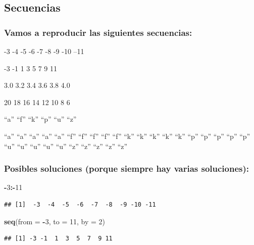 \documentclass[]{book}
\newenvironment{Shaded}{\begin{snugshade}}{\end{snugshade}}
\newcommand{\KeywordTok}[1]{\textcolor[rgb]{0.13,0.29,0.53}{\textbf{#1}}}
\newcommand{\DataTypeTok}[1]{\textcolor[rgb]{0.13,0.29,0.53}{#1}}
\newcommand{\DecValTok}[1]{\textcolor[rgb]{0.00,0.00,0.81}{#1}}
\newcommand{\OperatorTok}[1]{\textcolor[rgb]{0.81,0.36,0.00}{\textbf{#1}}}
\newcommand{\NormalTok}[1]{#1}
\begin{document}
\subsection{Secuencias}\label{secuencias}

\subsubsection{Vamos a reproducir las siguientes
secuencias:}\label{vamos-a-reproducir-las-siguientes-secuencias}

-3 -4 -5 -6 -7 -8 -9 -10 --11

-3 -1 1 3 5 7 9 11

3.0 3.2 3.4 3.6 3.8 4.0

20 18 16 14 12 10 8 6

``a'' ``f'' ``k'' ``p'' ``u'' ``z''

``a'' ``a'' ``a'' ``a'' ``a'' ``f'' ``f'' ``f'' ``f'' ``f'' ``k'' ``k''
``k'' ``k'' ``k'' ``p'' ``p'' ``p'' ``p'' ``p'' ``u'' ``u'' ``u'' ``u''
``u'' ``z'' ``z'' ``z'' ``z'' ``z''

\subsubsection{Posibles soluciones (porque siempre hay varias
soluciones):}\label{posibles-soluciones-porque-siempre-hay-varias-soluciones}

\begin{Shaded}
\begin{Highlighting}[]
\OperatorTok{-}\DecValTok{3}\OperatorTok{:-}\DecValTok{11}
\end{Highlighting}
\end{Shaded}

\begin{verbatim}
## [1]  -3  -4  -5  -6  -7  -8  -9 -10 -11
\end{verbatim}

\begin{Shaded}
\begin{Highlighting}[]
\KeywordTok{seq}\NormalTok{(}\DataTypeTok{from =} \OperatorTok{-}\DecValTok{3}\NormalTok{, }\DataTypeTok{to =} \DecValTok{11}\NormalTok{, }\DataTypeTok{by =} \DecValTok{2}\NormalTok{)}
\end{Highlighting}
\end{Shaded}

\begin{verbatim}
## [1] -3 -1  1  3  5  7  9 11
\end{verbatim}
\end{document}
